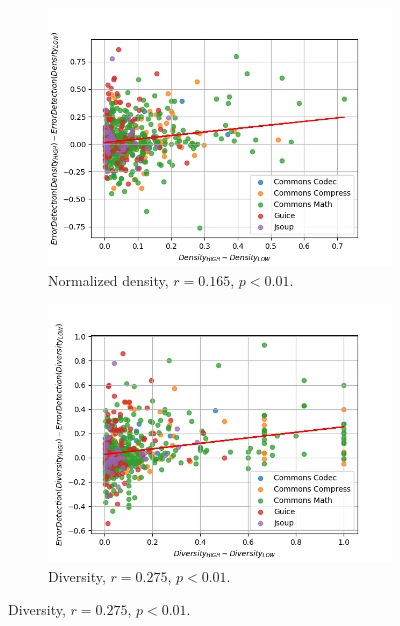 \documentclass[twoside,a4paper,11pt]{memoir}
\begin{document}
\begin{figure}
    \centering
    \begin{subfigure}[b]{0.49\linewidth}
        \centering
        \includegraphics[width=\linewidth]{figures/delta_error_detection_density}
        \caption{Normalized density, \(r=0.165 \), \(p<0.01 \).}%
        \label{fig:delta_error_detection_density}
    \end{subfigure}
    \hfill
    \begin{subfigure}[b]{0.49\linewidth}
        \centering
        \includegraphics[width=\linewidth]{figures/delta_error_detection_diversity}
        \caption{Diversity, \(r=0.275 \), \(p < 0.01 \).}%
        \label{fig:delta_error_detection_diversity}
    \end{subfigure}

\end{figure}
\end{document}
